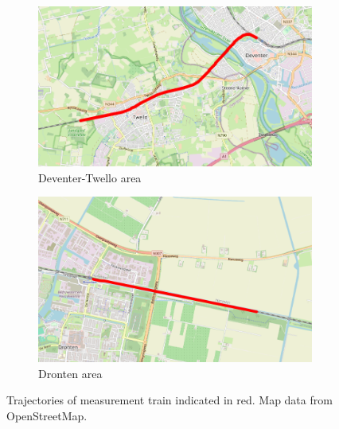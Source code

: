 \begin{figure}[ht]
    \centering
    \begin{subfigure}{0.45\textwidth}
        \includegraphics[width=\textwidth]{Chapters/objdet/figures/roi.png}
        \caption{Deventer-Twello area}
    \end{subfigure}%
    \hfill
    \begin{subfigure}{0.45\textwidth}
        \includegraphics[width=\textwidth]{Chapters/objdet/figures/dronten.png}
        \caption{Dronten area}
    \end{subfigure}%
    \caption{Trajectories of measurement train indicated in red. {\tiny Map data from OpenStreetMap.}}
    \label{fig:objdet:trajectory}
\end{figure}

